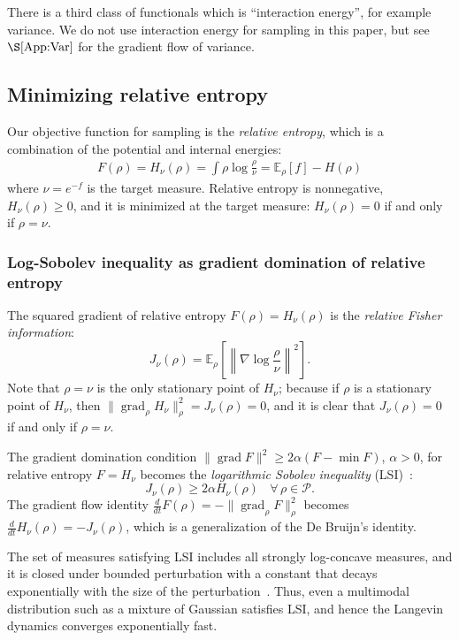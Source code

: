 \documentclass[final,12pt]{colt2018}
\newcommand{\E}{\mathbb{E}}
\DeclareMathOperator{\grad}{grad}
\renewcommand{\P}{\mathcal{P}}
\begin{document}
There is a third class of functionals
which is ``interaction energy'', for example variance.
We do not use interaction energy for sampling in this paper, but see~$\S\ref{App:Var}$ for the gradient flow of variance.


\subsection{Minimizing relative entropy}
\label{Sec:RelEnt}

Our objective function for sampling is the {\em relative entropy}, which is a combination of the potential and internal energies:
\begin{align}\label{Eq:FRelEnt}
F(\rho) = H_\nu(\rho) = \int \rho \log \frac{\rho}{\nu} = \E_\rho[f] - H(\rho)
\end{align}
where $\nu = e^{-f}$ is the target measure.
Relative entropy is nonnegative, $H_\nu(\rho) \ge 0$,
and it is minimized at the target measure: $H_\nu(\rho) = 0$ if and only if $\rho = \nu$.


\subsubsection{Log-Sobolev inequality as gradient domination of relative entropy}
\label{Sec:LSI}

The squared gradient of relative entropy $F(\rho) = H_\nu(\rho)$ is the {\em relative Fisher information}:
$$J_\nu(\rho) = \E_\rho\left[\left\|\nabla \log \frac{\rho}{\nu} \right\|^2\right].$$
Note that $\rho = \nu$ is the only stationary point of $H_\nu$;
because if $\rho$ is a stationary point of $H_\nu$, then $\|\grad_\rho H_\nu\|^2_\rho = J_\nu(\rho) = 0$, and it is clear that $J_\nu(\rho) = 0$ if and only if $\rho = \nu$.

The gradient domination condition $\|\grad F\|^2 \ge 2\alpha (F - \min F)$, $\alpha > 0$, for relative entropy $F = H_\nu$ becomes the {\em logarithmic Sobolev inequality} (LSI)~\cite[]{G75,OV00}:
$$J_\nu(\rho) \ge 2\alpha H_\nu(\rho) ~~~~ \forall \, \rho \in \P.$$
The gradient flow identity $\frac{d}{dt} F(\rho) = -\|\grad_\rho F\|^2_\rho$ becomes $\frac{d}{dt} H_\nu(\rho) = -J_\nu(\rho)$, which is a generalization of the De Bruijn's identity.

The set of measures satisfying LSI includes all strongly log-concave measures,
and it is closed under bounded perturbation with a constant that decays exponentially with the size of the perturbation~\cite[]{HS87}. 
Thus, even a multimodal distribution such as a mixture of Gaussian satisfies LSI, and hence the Langevin dynamics converges exponentially fast. 
\end{document}

